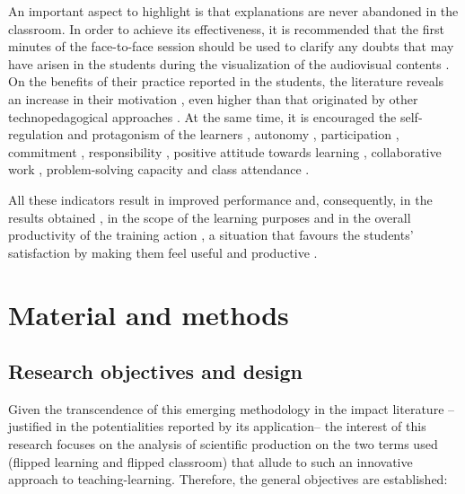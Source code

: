 \documentclass{textolivre}
\begin{document}
An important aspect to highlight is that explanations are never abandoned in the classroom. In order to achieve its effectiveness, it is recommended that the first minutes of the face-to-face session should be used to clarify any doubts that may have arisen in the students during the visualization of the audiovisual contents \cite{mok_teaching_2014}.
On the benefits of their practice reported in the students, the literature reveals an increase in their motivation \cite{shih_students_2016,tse_effects_2019}, even higher than that originated by other technopedagogical approaches \cite{thai_impact_2017}. At the same time, it is encouraged the self-regulation and protagonism of the learners \cite{mino-puigcercos_transforming_2018}, autonomy \cite{llanos_garcia_flipped_2019}, participation \cite{chyr_exploring_2017}, commitment \cite{bravo_desarrollo_2019,yilmaz_exploring_2017}, responsibility \cite{huang_investigating_2019}, positive attitude towards learning \cite{lee_what_2018,mcnally_flipped_2017}, collaborative work \cite{baez_perez_mirada_2019,kwon_impact_2018,wu_creating_2017}, problem-solving capacity \cite{daniela_flipped_2019,delozier_flipped_2017} and class attendance \cite{blair_performance_2016,mingorance_estrada_mejora_2017}.

All these indicators result in improved performance \cite{sola_martinez_eficacia_2019} and, consequently, in the results obtained \cite{fisher_flipped_2017,sacristan_san_cristobal_flipped_2017}, in the scope of the learning purposes \cite{awidi_impact_2019,kazanidis_can_2019} and in the overall productivity of the training action \cite{yoshida2016}, a situation that favours the students’ satisfaction by making them feel useful and productive \cite{romero_flipped_2019}.

\section{Material and methods}\label{sec-material}
\subsection{Research objectives and design}\label{sec-research}
Given the transcendence of this emerging methodology in the impact literature –justified in the potentialities reported by its application– the interest of this research focuses on the analysis of scientific production on the two terms used (flipped learning and flipped classroom) that allude to such an innovative approach to teaching-learning. Therefore, the general objectives are established:
\end{document}
